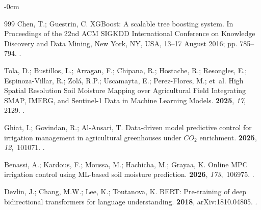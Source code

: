 \documentclass[land,review,accept,pdftex,oneauthor]{Definitions/mdpi}
\begin{document}
\begin{adjustwidth}{-\extralength}{0cm}
\begin{thebibliography}{999}
Chen, T.; Guestrin, C.
\newblock  XGBoost: A scalable tree boosting system. %
\newblock In Proceedings of the 22nd ACM SIGKDD International Conference on
  Knowledge Discovery and Data Mining,  New York, NY, USA, 13--17 August 2016; pp. 785--794.
.

Tola, D.; Bustillos, L.; Arragan, F.; Chipana, R.; Hostache, R.; Resongles, E.;
  Espinoza-Villar, R.; Zol{\'a}, R.P.; Uscamayta, E.; Perez-Flores, M.;  et~al.
\newblock High Spatial Resolution Soil Moisture Mapping over Agricultural Field
  Integrating SMAP, IMERG, and Sentinel-1 Data in Machine Learning Models.
 {\bf 2025}, {\em 17}, 2129.
.

Ghiat, I.; Govindan, R.; Al-Ansari, T.
\newblock Data-driven model predictive control for irrigation management in
  agricultural greenhouses under $CO_2$ enrichment.
 {\bf 2025}, {\em 12},~101071.
.

Benassi, A.; Kardous, F.; Moussa, M.; Hachicha, M.; Grayaa, K.
\newblock Online MPC irrigation control using ML-based soil moisture
  prediction.
 {\bf 2026}, {\em 173},~106975.
.

Devlin, J.; Chang, M.W.; Lee, K.; Toutanova, K.
\newblock BERT: Pre-training of deep bidirectional transformers for language
  understanding.
 {\bf 2018}, arXiv:1810.04805.
.


\end{thebibliography}
\end{adjustwidth}
\end{document}
